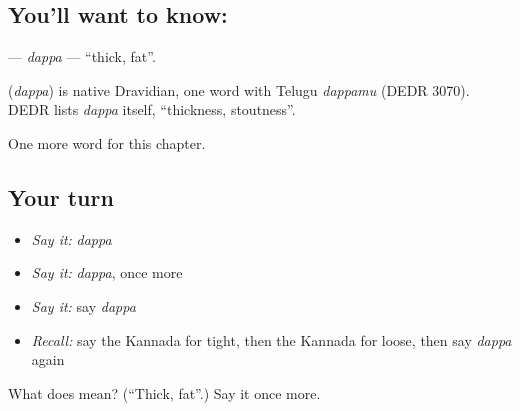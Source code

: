 \subsection*{You'll want to know: }
\textbf{} — \emph{dappa} — \textquotedblleft{}thick, fat\textquotedblright{}.

\begin{cousinweb}
\textbf{} (\emph{dappa}) is native Dravidian, one word with Telugu \emph{dappamu} (DEDR 3070). DEDR lists \emph{dappa} itself, \textquotedblleft{}thickness, stoutness\textquotedblright{}.
\end{cousinweb}

\begin{grammarlens}[title={What you've built}]
One more word for this chapter.
\end{grammarlens}

\subsection*{Your turn}
\begin{itemize}
\raggedright
  \item \emph{Say it:} \emph{dappa}
  \item \emph{Say it:} \emph{dappa}, once more
  \item \emph{Say it:} say \emph{dappa}
  \item \emph{Recall:} say the Kannada for tight, then the Kannada for loose, then say \emph{dappa} again
\end{itemize}

\begin{tcolorbox}[breakable,colback=teal!4,colframe=teal!35!black,title={Before you move on}]
What does  mean? (\textquotedblleft{}Thick, fat\textquotedblright{}.) Say it once more.
\end{tcolorbox}
